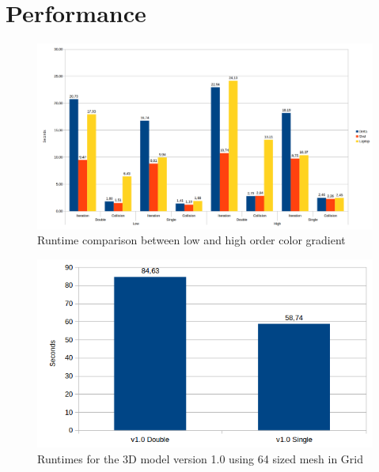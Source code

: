 \documentclass[12pt, openany]{book}
\begin{document}
{}



\appendix
\chapter{Performance}\label{app:perfo}
  \begin{figure}[H]
  	\centering
  	\includegraphics[width=\linewidth]{Resources/Images/highComp.png}
  	\caption{Runtime comparison between low and high order color gradient}
  	\label{fig:highComp}
  \end{figure}
    \begin{figure}[H]
    	\centering
    	\includegraphics[width=\linewidth]{Resources/Images/v13d64.png}
    	\caption{Runtimes for the 3D model version 1.0 using 64 sized mesh in Grid}
    	\label{fig:v13d64}
    \end{figure}
\end{document}
